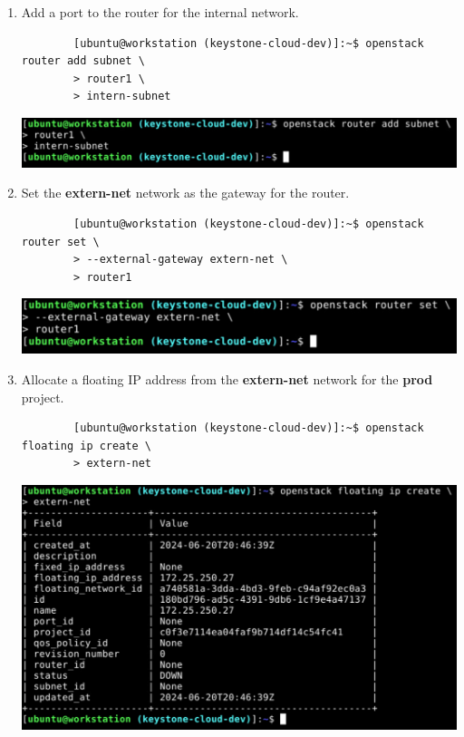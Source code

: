 \documentclass[letterpaper, 12pt]{article}
\begin{document}
\begin{enumerate}
    \item Add a port to the router for the internal network.
    \begin{lstlisting}
        [ubuntu@workstation (keystone-cloud-dev)]:~$ openstack router add subnet \
        > router1 \
        > intern-subnet
    \end{lstlisting}

    \begin{center}
        \includegraphics[width=\linewidth]{images/part1/step27.png}
    \end{center}

    \item Set the \textbf{extern-net} network as the gateway for the router.
    \begin{lstlisting}
        [ubuntu@workstation (keystone-cloud-dev)]:~$ openstack router set \
        > --external-gateway extern-net \
        > router1
    \end{lstlisting}

    \begin{center}
        \includegraphics[width=\linewidth]{images/part1/step28.png}
    \end{center}

    \item Allocate a floating IP address from the \textbf{extern-net} network for the \textbf{prod} project.
    \begin{lstlisting}
        [ubuntu@workstation (keystone-cloud-dev)]:~$ openstack floating ip create \
        > extern-net
    \end{lstlisting}

    \begin{center}
        \includegraphics[width=\linewidth]{images/part1/step29.png}
    \end{center}


\end{enumerate}
\end{document}
